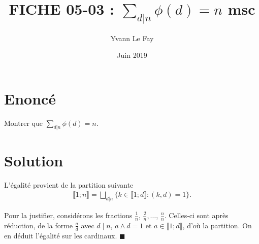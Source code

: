 \documentclass{article}
\newcommand*{\QED}{\hfill\ensuremath{\blacksquare}}%
\begin{document}
\title{FICHE 05-03 : $\sum_{d|n}\phi(d) = n$ msc}
\author{Yvann Le Fay}
\date{Juin 2019}
\maketitle

\section*{Enoncé}
Montrer que $\sum_{d|n}\phi(d) = n$.
\section*{Solution}
L'égalité provient de la partition suivante
\begin{align*}
\llbracket 1;n\rrbracket = \bigsqcup_{d|n}\{k\in\llbracket 1;d\rrbracket : (k,d) = 1\}.
\end{align*}

Pour la justifier, considérons les fractions $\frac{1}{n}$, $\frac{2}{n}, \ldots$, $\frac{n}{n}$. Celles-ci sont après réduction, de la forme $\frac{a}{d}$ avec $d\mid n$, $a\wedge d = 1$ et $a\in\llbracket 1;d\rrbracket$, d'où la partition. On en déduit l'égalité sur les cardinaux.
\QED
\end{document}

